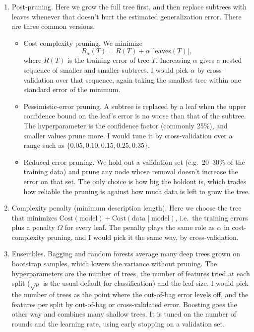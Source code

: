 \documentclass[12pt,letterpaper, onecolumn]{exam}
\begin{document}
\begin{questions}
\begin{solution}
\begin{enumerate}[1.)]
            \item Post-pruning. Here we grow the full tree first, and then replace subtrees with leaves whenever that doesn't hurt the estimated generalization error. There are three common versions.
            \begin{itemize}
                \item Cost-complexity pruning. We minimize \[R_\alpha(T) = R(T)+\alpha\,|\text{leaves}(T)|,\] where $R(T)$ is the training error of tree $T$. Increasing $\alpha$ gives a nested sequence of smaller and smaller subtrees. I would pick $\alpha$ by cross-validation over that sequence, again taking the smallest tree within one standard error of the minimum.
                \item Pessimistic-error pruning. A subtree is replaced by a leaf when the upper confidence bound on the leaf's error is no worse than that of the subtree. The hyperparameter is the confidence factor (commonly 25\%), and smaller values prune more. I would tune it by cross-validation over a range such as $\{0.05, 0.10, 0.15, 0.25, 0.35\}$.
                \item Reduced-error pruning. We hold out a validation set (e.g.\ 20--30\% of the training data) and prune any node whose removal doesn't increase the error on that set. The only choice is how big the holdout is, which trades how reliable the pruning is against how much data is left to grow the tree.
            \end{itemize}

            \item Complexity penalty (minimum description length). Here we choose the tree that minimizes $\text{Cost}(\text{model})+\text{Cost}(\text{data}\mid\text{model})$, i.e.\ the training errors plus a penalty $\Omega$ for every leaf. The penalty plays the same role as $\alpha$ in cost-complexity pruning, and I would pick it the same way, by cross-validation.

            \item Ensembles. Bagging and random forests average many deep trees grown on bootstrap samples, which lowers the variance without pruning. The hyperparameters are the number of trees, the number of features tried at each split ($\sqrt{p}$ is the usual default for classification) and the leaf size. I would pick the number of trees as the point where the out-of-bag error levels off, and the features per split by out-of-bag or cross-validated error. Boosting goes the other way and combines many shallow trees. It is tuned on the number of rounds and the learning rate, using early stopping on a validation set.
        \end{enumerate}


\end{solution}
\end{questions}
\end{document}
